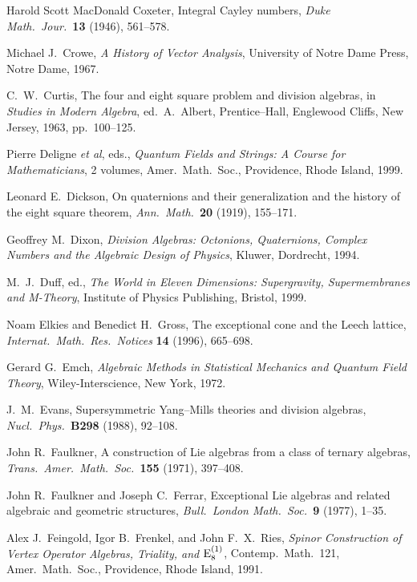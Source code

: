 \begin{thebibliography}{10}
 Harold Scott MacDonald Coxeter, Integral Cayley    
numbers, {\sl Duke Math.\ Jour.\ }{\bf 13} (1946), 561--578.   
   
 Michael J.\ Crowe, {\sl A History of Vector Analysis},   
University of Notre Dame Press, Notre Dame, 1967.   

 C.\ W.\ Curtis, The four and eight square problem    
and division algebras, in {\sl Studies in Modern Algebra}, ed.\    
A.\ Albert, Prentice--Hall, Englewood Cliffs, New Jersey, 1963, pp.\ 100--125.
 
 Pierre Deligne {\it et al}, eds., {\sl Quantum
Fields and Strings: A Course for Mathematicians}, 2 volumes, Amer.\ 
Math.\ Soc., Providence, Rhode Island, 1999. 
 
 Leonard E.\ Dickson, On quaternions and their  
generalization and the history of the eight square theorem, {\sl
Ann.\ Math.\ }{\bf 20} (1919), 155--171.   
   
 Geoffrey M.\ Dixon, {\sl Division Algebras: Octonions,   
Quaternions, Complex Numbers and the Algebraic Design of Physics},   
Kluwer, Dordrecht, 1994.   
 
 M.\ J.\ Duff, ed., {\sl The World in Eleven Dimensions:  
Supergravity, Supermembranes and M-Theory}, Institute of Physics 
Publishing, Bristol, 1999. 
 
 Noam Elkies and Benedict H.\ Gross, The exceptional
cone and the Leech lattice, {\sl Internat.\ Math.\ Res.\ Notices}
{\bf 14} (1996), 665--698.

 Gerard G.\ Emch, {\sl Algebraic Methods in Statistical 
Mechanics and Quantum Field Theory}, Wiley-Interscience, New York, 1972.

\bibitem{Evans} J.\ M.\ Evans, Supersymmetric Yang--Mills theories and   
division algebras, {\sl Nucl.\ Phys.\ }{\bf B298} (1988), 92--108.   
   
\bibitem{Faulkner} John R.\ Faulkner, A construction of Lie algebras from
a class of ternary algebras, {\sl Trans.\ Amer.\ Math.\ Soc.\ }{\bf 155}
(1971), 397--408.

 John R.\ Faulkner and Joseph C.\ Ferrar,    
Exceptional Lie algebras and related algebraic and geometric structures,   
{\sl Bull.\ London Math.\ Soc.\ }{\bf 9} (1977), 1--35.   

 Alex J.\ Feingold, Igor B.\ Frenkel, and John F.\ X.\
Ries, {\sl Spinor Construction of Vertex Operator Algebras, Triality, and
${\rm E}_8^{(1)}$}, Contemp.\ Math.\ 121, Amer.\ Math.\ Soc., 
Providence, Rhode Island, 1991.


\end{thebibliography}
